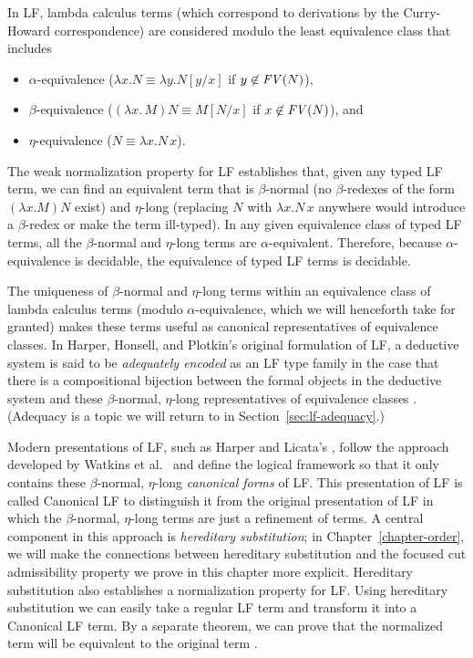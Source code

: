 In LF, lambda calculus terms (which correspond to derivations by the
Curry-Howard correspondence) are considered modulo the least
equivalence class that includes
\begin{itemize}
\item $\alpha$-equivalence ($\lambda x.N \equiv \lambda y.N[y/x]$ if 
$y \not\in {\it FV}(N)$), 
\item $\beta$-equivalence 
($(\lambda x.\,M)N \equiv M[N/x]$ if $x \not\in {\it FV}(N)$), and 
\item $\eta$-equivalence ($N \equiv \lambda x.N\,x$).
\end{itemize}
The weak normalization property for LF establishes that, given any
typed LF term, we can find an equivalent term that is $\beta$-normal
(no $\beta$-redexes of the form $(\lambda x.M) N$ exist) and
$\eta$-long (replacing $N$ with $\lambda x.N\,x$ anywhere would
introduce a $\beta$-redex or make the term ill-typed).  
In any given equivalence class of typed LF terms, all the
$\beta$-normal and $\eta$-long terms are $\alpha$-equivalent.
Therefore, because $\alpha$-equivalence is decidable, the equivalence
of typed LF terms is  decidable. 

The uniqueness of $\beta$-normal and $\eta$-long terms within an
equivalence class of lambda calculus terms (modulo
$\alpha$-equivalence, which we will henceforth take for granted) makes
these terms useful as canonical representatives of equivalence
classes. In Harper, Honsell, and Plotkin's original formulation
of LF, a deductive system is said to be {\it adequately encoded} as
an LF type family in the case that there is a compositional bijection
between the formal objects in the deductive system and these
$\beta$-normal, $\eta$-long representatives of equivalence classes
\cite{harper93framework}. (Adequacy is a topic we will return to in 
Section~\ref{sec:lf-adequacy}.)

Modern presentations of LF, such as Harper and Licata's
\cite{harper07mechanizing}, follow the approach developed by Watkins
et al.~\cite{watkins02concurrent} and define the logical framework so
that it only contains these $\beta$-normal, $\eta$-long {\it canonical
  forms} of LF. This presentation of LF is called Canonical LF to
distinguish it from the original presentation of LF in which the
$\beta$-normal, $\eta$-long terms are just a refinement of terms. A
central component in this approach is {\it hereditary substitution};
in Chapter~\ref{chapter-order}, we will make the connections between
hereditary substitution and the focused cut admissibility property we
prove in this chapter more explicit.  Hereditary substitution also
establishes a normalization property for LF. Using hereditary
substitution we can easily take a regular LF term and transform it
into a Canonical LF term. By a separate theorem, we can prove that the
normalized term will be equivalent to the original term
\cite{martens12lf}. %

